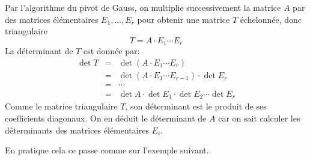 \documentclass{book}
\begin{document}
\begin{Algorithme}
Par l'algorithme du pivot de Gauss, on multiplie successivement la matrice
$A$ par des matrices élémentaires $E_1,\ldots,E_r$ pour obtenir une matrice $T$
échelonnée, donc triangulaire
\[
T = A  \cdot E_1 \cdots E_r
\]
La déterminant de $T$ est donnée par:
$$
\begin{array}{rcl}
\det T
  &=& \det (A \cdot E_1 \cdots E_r) \\
  &=& \det (A \cdot E_1 \cdots E_{r-1})\cdot \det E_r \\
  &=& \cdots \\
  &=& \det A \cdot \det E_1\cdot \det E_2 \cdots \det E_r
\end{array}
$$
Comme le matrice triangulaire $T$, son déterminant est le produit de ses coefficients diagonaux.  On en déduit le déterminant de $A$  car on sait calculer les déterminants des matrices élémentaires
$E_i$.
\end{Algorithme}
En pratique cela ce passe comme sur l'exemple suivant.
\end{document}
